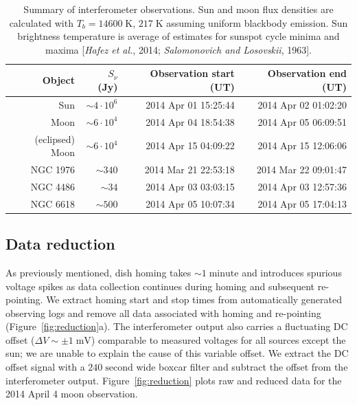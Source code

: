 \documentclass[10pt]{article}
\newcommand {\mt}{\mathrm}
\newcommand {\unit}[1]{\; \mt{#1}}
\begin{document}
\begin{table}[!ht]
\centering
\caption{Summary of interferometer observations.  Sun and moon flux densities are calculated with $T_b = 14600 \unit{K}$, $217 \unit{K}$ assuming uniform blackbody emission.  Sun brightness temperature is average of estimates for sunspot cycle minima and maxima [\textit{Hafez et al.}, 2014; \textit{Salomonovich and Losovskii}, 1963].}
\label{tab:obs}
\begin{tabular}{@{}rrrr@{}}
    \toprule
    Object & $S_\nu$ (Jy) & Observation start (UT) & Observation end (UT) \\
    \midrule
    Sun & $\sim 4 \cdot 10^6$ & 2014 Apr 01 15:25:44 & 2014 Apr 02 01:02:20 \\
    Moon & $\sim 6 \cdot 10^4$ & 2014 Apr 04 18:54:38 & 2014 Apr 05 06:09:51 \\
    (eclipsed) Moon & $\sim 6 \cdot 10^4$ & 2014 Apr 15 04:09:22 & 2014 Apr 15 12:06:06 \\
    NGC 1976 & $\sim 340$ & 2014 Mar 21 22:53:18 & 2014 Mar 22 09:01:47 \\
    NGC 4486 & $\sim 34$ & 2014 Apr 03 03:03:15 & 2014 Apr 03 12:57:36 \\  %
    NGC 6618 & $\sim 500$ & 2014 Apr 05 10:07:34 & 2014 Apr 05 17:04:13 \\
    \bottomrule
\end{tabular}
\end{table}

\subsection{Data reduction}

As previously mentioned, dish homing takes $\sim1 \unit{minute}$ and introduces spurious voltage spikes as data collection continues during homing and subsequent re-pointing.  We extract homing start and stop times from automatically generated observing logs and remove all data associated with homing and re-pointing (Figure~\ref{fig:reduction}a).  The interferometer output also carries a fluctuating DC offset ($\Delta V \sim \pm 1 \unit{mV}$) comparable to measured voltages for all sources except the sun; we are unable to explain the cause of this variable offset.  We extract the DC offset signal with a $240 \unit{second}$ wide boxcar filter and subtract the offset from the interferometer output.  Figure~\ref{fig:reduction} plots raw and reduced data for the 2014 April 4 moon observation.
\end{document}
